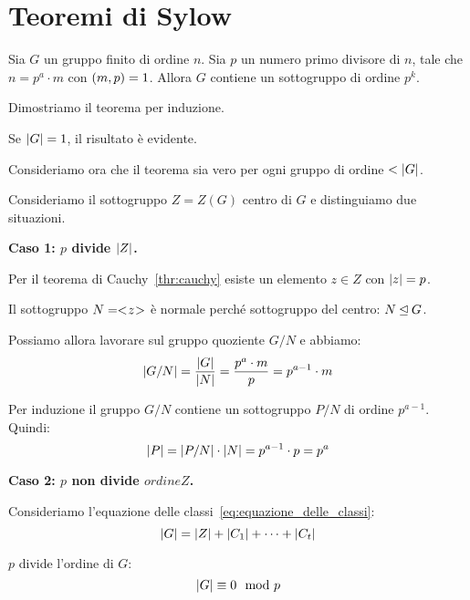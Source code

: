 \chapter{Teoremi di Sylow}
\label{ch:sylow}

\begin{teorema}
    \label{th:sylow_1}
    Sia $G$ un gruppo finito di ordine $n$.
    Sia $p$ un numero primo divisore di $n$, tale che $n = p^a \cdot m$ con $ ( m , p )  = 1$.
    Allora $G$ contiene un sottogruppo di ordine $p^k$.
\end{teorema}
\begin{dimostrazione}
    Dimostriamo il teorema per induzione.

    Se $\lvert G \rvert = 1$, il risultato è evidente.

    Consideriamo ora che il teorema sia vero per ogni gruppo di ordine $< \lvert G \rvert$.

    Consideriamo il sottogruppo $Z = Z(G)$ centro di $G$ e distinguiamo due situazioni.

    \bigskip
    \textbf{Caso 1: $p$ divide $\lvert Z \rvert$.}

    Per il teorema di Cauchy~\ref{thr:cauchy} esiste un elemento $z \in Z$ con $\lvert z \rvert = p$.

    Il sottogruppo $N = < \negmedspace z \negmedspace >$ è normale perché sottogruppo del centro: $N \unlhd G$.

    Possiamo allora lavorare sul gruppo quoziente $G/N$ e abbiamo:
    \begin{equation*}
        \lvert G/N \rvert = \dfrac{\lvert G \rvert}{\lvert N \rvert} = \dfrac{p^a \cdot m}{p} = p^{a-1} \cdot m
    \end{equation*}

    Per induzione il gruppo $G/N$ contiene un sottogruppo $P/N$ di ordine $p^{a-1}$.
    Quindi:
    \begin{equation*}
        \lvert P \rvert = \lvert P/N \rvert \cdot \lvert N \rvert = p^{a-1} \cdot p = p^a
    \end{equation*}
    
    \bigskip
    \textbf{Caso 2: $p$ non divide $ordine{Z}$.}

    Consideriamo l'equazione delle classi~\ref{eq:equazione_delle_classi}:
    \begin{equation*}
        \lvert G \rvert = \lvert Z \rvert + \lvert C_1 \rvert + \dots + \lvert C_t \rvert
    \end{equation*}

    $p$ divide l'ordine di $G$:
    \begin{equation*}
        \lvert G \rvert \equiv 0 \mod p
    \end{equation*}


\end{dimostrazione}
